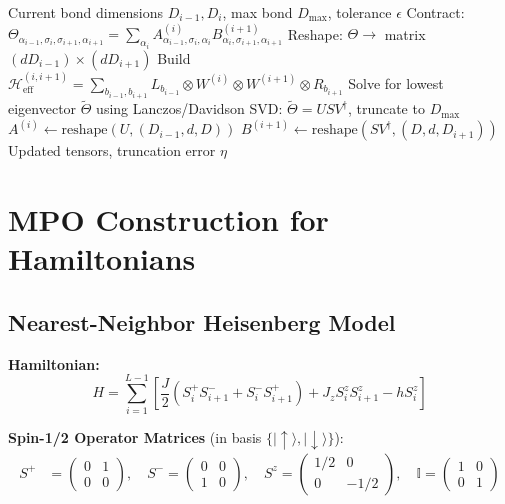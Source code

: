 \documentclass[aps,prb,onecolumn,scriptaddress]{revtex4-2}
\newcommand{\ket}[1]{|#1\rangle}
\newcommand{\Id}{\mathbb{I}}
\newcommand{\eps}{\epsilon}
\begin{document}
\begin{algorithm}[H]
\caption{TwoSiteUpdate}
\begin{algorithmic}[1]
\Require Current bond dimensions $D_{i-1}, D_i$, max bond $D_{\max}$, tolerance $\eps$					
\State Contract: $\Theta_{\alpha_{i-1},\sigma_i,\sigma_{i+1},\alpha_{i+1}} = \sum_{\alpha_i} A^{(i)}_{\alpha_{i-1},\sigma_i,\alpha_i} B^{(i+1)}_{\alpha_i,\sigma_{i+1},\alpha_{i+1}}$
\State Reshape: $\Theta \to$ matrix $(d D_{i-1}) \times (d D_{i+1})$
\State Build $\mathcal{H}_{\text{eff}}^{(i,i+1)} = \sum_{b_{i-1}, b_{i+1}} L_{b_{i-1}} \otimes W^{(i)} \otimes W^{(i+1)} \otimes R_{b_{i+1}}$
\State Solve for lowest eigenvector $\tilde{\Theta}$ using Lanczos/Davidson
\State SVD: $\tilde{\Theta} = U S V^\dagger$, truncate to $D_{\max}$
\State $A^{(i)} \gets \text{reshape}(U, (D_{i-1}, d, D))$
\State $B^{(i+1)} \gets \text{reshape}(S V^\dagger, (D, d, D_{i+1}))$
\State \Return Updated tensors, truncation error $\eta$
\end{algorithmic}
\end{algorithm}

\section{MPO Construction for Hamiltonians}
\label{sec:mpo}

\subsection{Nearest-Neighbor Heisenberg Model}

\textbf{Hamiltonian:}
\begin{equation}
	H = \sum_{i=1}^{L-1} \left[ \frac{J}{2}(S_i^+ S_{i+1}^- + S_i^- S_{i+1}^+) + J_z S_i^z S_{i+1}^z - h S_i^z \right]
\end{equation}

\textbf{Spin-1/2 Operator Matrices} (in basis $\{\ket{\uparrow}, \ket{\downarrow}\}$):
\begin{align}
	S^+ &= \begin{pmatrix} 0 & 1 \\ 0 & 0 \end{pmatrix}, \quad
	S^- = \begin{pmatrix} 0 & 0 \\ 1 & 0 \end{pmatrix}, \quad
	S^z = \begin{pmatrix} 1/2 & 0 \\ 0 & -1/2 \end{pmatrix}, \quad
	\Id = \begin{pmatrix} 1 & 0 \\ 0 & 1 \end{pmatrix}
\end{align}
\end{document}
